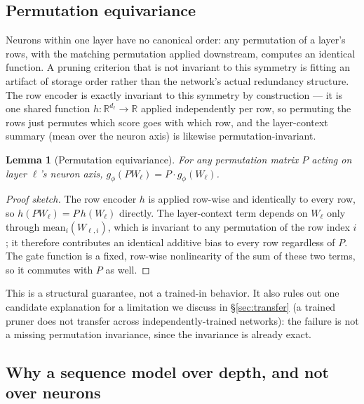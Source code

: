 \documentclass[11pt]{article}
\newtheorem{lemma}{Lemma}
\begin{document}
\subsection{Permutation equivariance}
\label{sec:permutation}

Neurons within one layer have no canonical order: any permutation of a
layer's rows, with the matching permutation applied downstream, computes an
identical function. A pruning criterion that is not invariant to this
symmetry is fitting an artifact of storage order rather than the network's
actual redundancy structure. The row encoder is exactly invariant to this
symmetry by construction --- it is one shared function $h: \mathbb{R}^{d_\ell}
\to \mathbb{R}$ applied independently per row, so permuting the rows just
permutes which score goes with which row, and the layer-context summary
($\mathrm{mean}$ over the neuron axis) is likewise permutation-invariant.

\begin{lemma}[Permutation equivariance]
For any permutation matrix $P$ acting
on layer $\ell$'s neuron axis, $g_\phi(PW_\ell) = P \cdot g_\phi(W_\ell)$.
\end{lemma}

\begin{proof}[Proof sketch]
The row encoder $h$ is applied row-wise and identically to
every row, so $h(PW_\ell) = P\,h(W_\ell)$ directly. The layer-context term
depends on $W_\ell$ only through $\mathrm{mean}_i(W_{\ell,i})$, which is
invariant to any permutation of the row index $i$; it therefore contributes
an identical additive bias to every row regardless of $P$. The gate function
is a fixed, row-wise nonlinearity of the sum of these two terms, so it
commutes with $P$ as well.
\end{proof}

This is a structural guarantee, not a trained-in behavior. It also rules out
one candidate explanation for a limitation we discuss in \S\ref{sec:transfer} (a trained
pruner does not transfer across independently-trained networks): the failure
is not a missing permutation invariance, since the invariance is already
exact.

\subsection{Why a sequence model over depth, and not over neurons}
\label{sec:depth-sequence}
\end{document}
